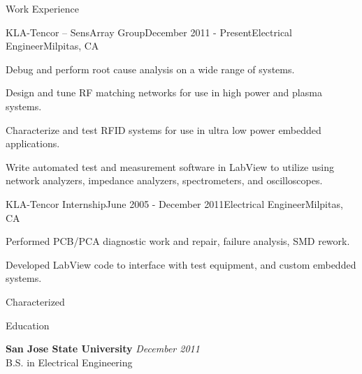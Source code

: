 \documentclass{resume} %
\begin{document}
\begin{rSection}{Work Experience}
\begin{rSubsection}{KLA-Tencor -- SensArray Group}{December 2011 - Present}{Electrical Engineer}{Milpitas, CA}
\item Debug and perform root cause analysis on a wide range of systems.
\item Design and tune RF matching networks for use in high power and plasma systems.
\item Characterize and test RFID systems for use in ultra low power embedded applications.
\item Write automated test and measurement software in LabView to utilize using network analyzers, impedance analyzers, spectrometers, and oscilloscopes.

\end{rSubsection}


\begin{rSubsection}{KLA-Tencor Internship}{June 2005 - December 2011}{Electrical Engineer}{Milpitas, CA}
\item Performed PCB/PCA diagnostic work and repair, failure analysis, SMD rework.
\item Developed LabView code to interface with test equipment, and custom embedded systems.
\item Characterized 
\end{rSubsection}

\end{rSection}


\begin{rSection}{Education}

{\bf San Jose State University} \hfill {\em December 2011} \\ 
B.S. in Electrical Engineering \\

\end{rSection}





\end{document}
